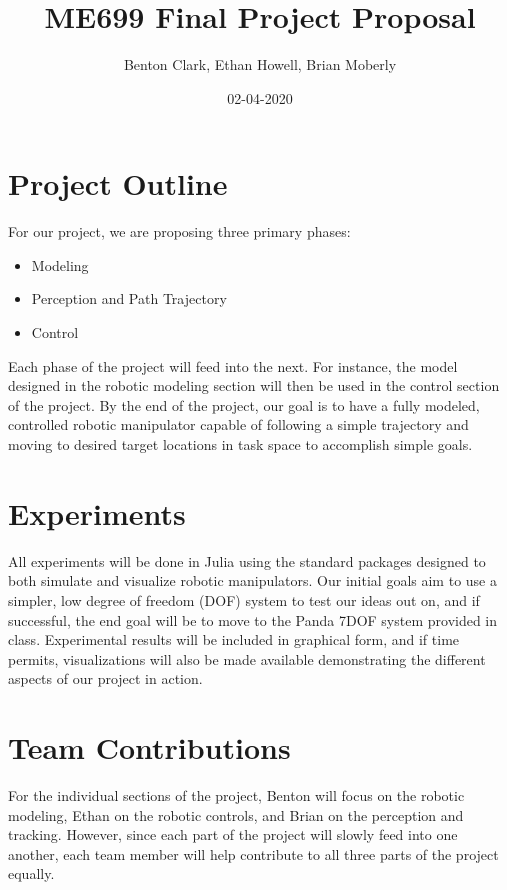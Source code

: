 \documentclass{article}
\title{ME699 Final Project Proposal}
\date{02-04-2020}
\author{Benton Clark, Ethan Howell, Brian Moberly}
\begin{document}
\maketitle

\section{Project Outline}
For our project, we are proposing three primary phases:

\begin{itemize}
  \item Modeling
  \item Perception and Path Trajectory
  \item Control
\end{itemize}

\noindent Each phase of the project will feed into the next.
For instance, the model designed in the robotic modeling section will then be
used in the control section of the project.
By the end of the project, our goal is to have a fully modeled, controlled
robotic manipulator capable of following a simple trajectory and moving to
desired target locations in task space to accomplish simple goals.





\section{Experiments}
All experiments will be done in Julia using the standard packages designed to
both simulate and visualize robotic manipulators.
Our initial goals aim to use a simpler, low degree of freedom (DOF) system to
test our ideas out on, and if successful, the end goal will be to move to the
Panda 7DOF system provided in class.
Experimental results will be included in graphical form, and if time permits,
visualizations will also be made available demonstrating the different aspects
of our project in action.

\section{Team Contributions}
For the individual sections of the project, Benton will focus on the robotic
modeling, Ethan on the robotic controls, and Brian on the perception and
tracking.
However, since each part of the project will slowly feed into one another, each
team member will help contribute to all three parts of the project equally.
\end{document}
